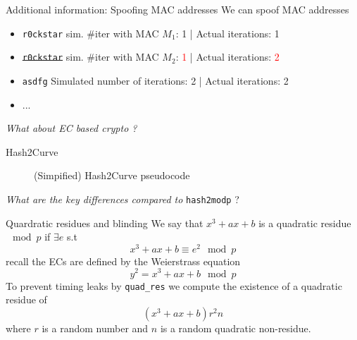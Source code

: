 \documentclass[xcolor=table]{bredelebeamer}
\begin{document}
\begin{frame}{Additional information: Spoofing MAC addresses}
    \exampleCodeB
    We can spoof MAC addresses
    \begin{itemize}
        \item \texttt{r0ckstar} \hfill sim. #iter with MAC $M_1$: 1 | Actual iterations: 1
        \item \st{\texttt{r0ckstar}} \hfill sim. #iter with MAC $M_2$: \textcolor{red}{1} | Actual iterations: \textcolor{red}{2}

        \item \texttt{asdfg} \hfill Simulated number of iterations: 2 | Actual iterations: 2
        \item ...
    \end{itemize}
        \vspace{30pt}
        \textit{ \Large{What about EC based crypto ?}}
\end{frame}
\begin{frame}{Hash2Curve}
\begin{figure}
    \centering
\exampleCodeC
\caption{(Simpified) Hash2Curve pseudocode}
    \label{fig:my_label}
\end{figure}
    \Large{\textit{What are the key differences compared to} \texttt{hash2modp} ?}
\end{frame}
\begin{frame}{Quardratic residues and blinding}
    We say that $x^3+ax+b$ is a quadratic residue $\mod p$ if $\exists e$ s.t
    $$x^3+ax+b \equiv e^2 \mod p$$
    recall the ECs are defined by the Weierstrass equation
    $$y^2 = x^3 + ax + b \mod p$$
    To prevent timing leaks by \texttt{quad\_res} we compute the existence of a quadratic residue of
    $$(x^3+ax+b)r^2n$$
    where $r$ is a random number and $n$ is a random quadratic non-residue.
\end{frame}
\end{document}
